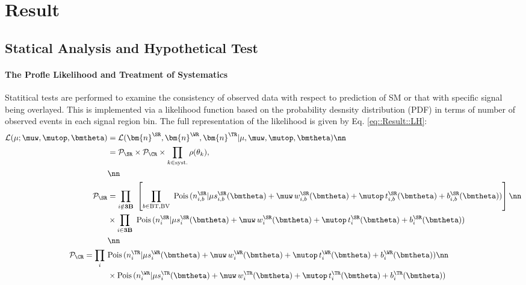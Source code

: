 \clearpage

\section{Result} 

\subsection{Statical Analysis and Hypothetical Test} \label{sec::Result::statistics}
\paragraph{The Profle Likelihood and Treatment of Systematics}
Statitical tests are performed to examine the consistency of observed data with respect to prediction of SM or that with specific signal being overlayed. This is implemented via a likelihood function based on the probability desnsity distribution (PDF) in terms of number of observed events in each signal region bin. The full representation of the likelihood is given by Eq. \ref{eq::Result::LH}:
\begin{align}
 \mathcal{L} (\mu; \muw, \mutop, \bmtheta)  
 & =  \mathcal{L} ( \bm{n}^{\SR}, \bm{n}^{\WR}, \bm{n}^{\TR} | \mu, \muw, \mutop, \bmtheta) \nn \\
  & = \mathcal{P}_{\SR} \times \mathcal{P}_{\CR}  \times \prod_{k\in \mathrm{syst.}} \rho(\theta_k), \\
& \nn \\
% 
  \mathcal{P}_{\SR} & = \prod_{i\notin \textbf{3B}} \,\, \left[ \prod_{b \in \mathrm{BT}, \mathrm{BV}} \,\, \mathrm{Pois}\, (n^{\SR}_{i,b} | \mu s^{\SR}_{i,b}(\bmtheta) + \muw \,  w^{\SR}_{i,b}(\bmtheta) + \mutop \,  t^{\SR}_{i,b}(\bmtheta) + b^{\SR}_{i,b}(\bmtheta)) \right] \nn \\
& \times \prod_{i\in \textbf{3B}} \,\, \mathrm{Pois}\, (n^{\SR}_i | \mu s^{\SR}_i(\bmtheta) + \muw \,  w^{\SR}_i(\bmtheta) + \mutop \,  t^{\SR}_i(\bmtheta) + b^{\SR}_i(\bmtheta))  \\
& \nn\\
%
  \mathcal{P}_{\CR} =  \prod_i \,\,
  &        \mathrm{Pois}\, (n^{\TR}_i | \mu s^{\WR}_i(\bmtheta) + \muw \,  w^{\WR}_i(\bmtheta) + \mutop \,  t^{\WR}_i(\bmtheta) + b^{\WR}_i(\bmtheta))  \nn \\
  & \times \mathrm{Pois}\, (n^{\WR}_i | \mu s^{\TR}_i(\bmtheta) + \muw \,  w^{\TR}_i(\bmtheta) + \mutop \,  t^{\TR}_i(\bmtheta) + b^{\TR}_i(\bmtheta))  
\label{eq::Result::LH}
\end{align}
